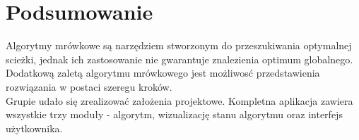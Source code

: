 \documentclass[printmode, openany, oneside, eng]{mgr}
\begin{document}
\chapter{Podsumowanie} \label{chap:end}

Algorytmy mrówkowe są narzędziem stworzonym do przeszukiwania optymalnej scieżki, jednak ich zastosowanie nie gwarantuje znalezienia optimum globalnego. Dodatkową zaletą algorytmu mrówkowego jest możliwosć przedstawienia rozwiązania w postaci szeregu kroków.\\
Grupie udało się zrealizować założenia projektowe. Kompletna aplikacja zawiera wszystkie trzy moduły - algorytm, wizualizację stanu algorytmu oraz interfejs użytkownika.
\end{document}
